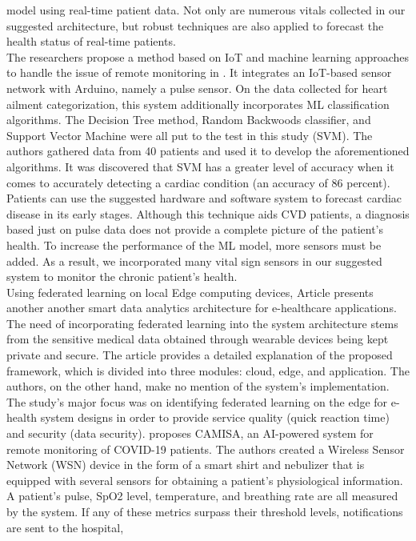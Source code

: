 \documentclass{bmcart}
\begin{document}
model using real-time patient data. Not only are numerous vitals collected in
our suggested architecture, but robust techniques are also applied to forecast
the health status of real-time patients.\\
The researchers propose a method based on IoT and machine learning approaches to
handle the issue of remote monitoring in \cite{9167660}. It integrates an
IoT-based sensor network with Arduino, namely a pulse sensor. On the data
collected for heart ailment categorization, this system additionally
incorporates ML classification algorithms. The Decision Tree method, Random
Backwoods classifier, and Support Vector Machine were all put to the test in
this study (SVM). The authors gathered data from 40 patients and used it to
develop the aforementioned algorithms. It was discovered that SVM has a greater
level of accuracy when it comes to accurately detecting a cardiac condition (an
accuracy of 86 percent). Patients can use the suggested hardware and software
system to forecast cardiac disease in its early stages. Although this technique
aids CVD patients, a diagnosis based just on pulse data does not provide a
complete picture of the patient's health. To increase the performance of the ML
model, more sensors must be added. As a result, we incorporated many vital sign
sensors in our suggested system to monitor the chronic patient's health.\\
Using federated learning on local Edge computing devices, Article \cite{9377873}
presents another another smart data analytics architecture for e-healthcare
applications. The need of incorporating federated learning into the system
architecture stems from the sensitive medical data obtained through wearable
devices being kept private and secure. The article provides a detailed
explanation of the proposed framework, which is divided into three modules:
cloud, edge, and application. The authors, on the other hand, make no mention of
the system's implementation. The study's major focus was on identifying
federated learning on the edge for e-health system designs in order to provide
service quality (quick reaction time) and security (data security).\cite{gbha}
proposes CAMISA, an AI-powered system for remote monitoring of COVID-19
patients. The authors created a Wireless Sensor Network (WSN) device in the form
of a smart shirt and nebulizer that is equipped with several sensors for
obtaining a patient's physiological information. A patient's pulse, SpO2 level,
temperature, and breathing rate are all measured by the system. If any of these
metrics surpass their threshold levels, notifications are sent to the hospital,
\end{document}
